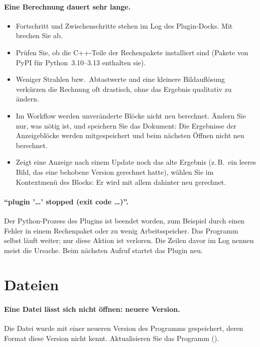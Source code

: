 \paragraph{Eine Berechnung dauert sehr lange.}
\begin{itemize}
  \item Fortschritt und Zwischenschritte stehen im Log des Plugin-Docks. Mit 
    brechen Sie ab.
  \item Prüfen Sie, ob die C++-Teile der Rechenpakete installiert sind (Pakete von PyPI für
    Python~3.10--3.13 enthalten sie).
  \item Weniger Strahlen bzw.\ Abtastwerte und eine kleinere Bildauflösung verkürzen die
    Rechnung oft drastisch, ohne das Ergebnis qualitativ zu ändern.
  \item Im Workflow werden unveränderte Blöcke nicht neu berechnet. Ändern Sie nur, was nötig
    ist, und speichern Sie das Dokument: Die Ergebnisse der Anzeigeblöcke werden mitgespeichert
    und beim nächsten Öffnen nicht neu berechnet.
  \item Zeigt eine Anzeige nach einem Update noch das alte Ergebnis (z.\,B.\ ein leeres Bild,
    das eine behobene Version gerechnet hatte), wählen Sie  im Kontextmenü des
    Blocks: Er wird mit allem dahinter neu gerechnet.
\end{itemize}

\paragraph{\enquote{plugin '\dots' stopped (exit code \dots)}.}
Der Python-Prozess des Plugins ist beendet worden, zum Beispiel durch einen Fehler in einem
Rechenpaket oder zu wenig Arbeitsspeicher. Das Programm selbst läuft weiter; nur diese Aktion
ist verloren. Die Zeilen davor im Log nennen meist die Ursache. Beim nächsten Aufruf startet
das Plugin neu.

\section{Dateien}

\paragraph{Eine Datei lässt sich nicht öffnen: neuere Version.}
Die Datei wurde mit einer neueren Version des Programms gespeichert, deren Format diese Version
nicht kennt. Aktualisieren Sie das Programm ().

